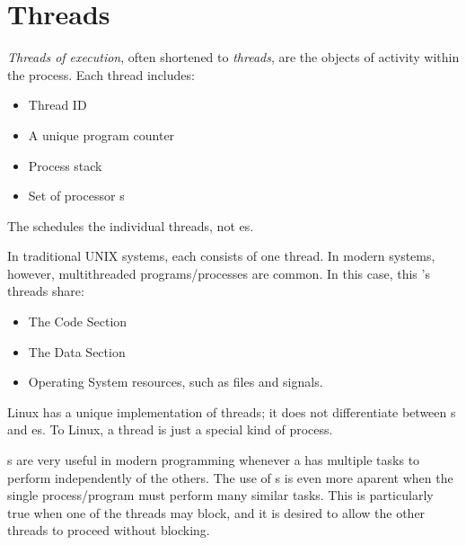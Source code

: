 \section{Threads}\label{sec:Threads}
\begin{definition}[Thread]\label{def:Thread}
  \emph{Threads of execution}, often shortened to \emph{threads}, are the objects of activity within the process.
  Each thread includes:
  \begin{itemize}[noitemsep]
  \item Thread ID
  \item A unique program counter
  \item Process stack
  \item Set of processor s
  \end{itemize}

  The  schedules the individual threads, not es.

  In traditional UNIX systems, each  consists of one thread.
  In modern systems, however, multithreaded programs/processes are common.
  In this case, this 's threads share:
  \begin{itemize}[noitemsep]
  \item The Code Section
  \item The Data Section
  \item Operating System resources, such as files and signals.
  \end{itemize}

  \begin{remark}\label{rmk:Linux_Threads}
    Linux has a unique implementation of threads; it does not differentiate between s and es.
    To Linux, a thread is just a special kind of process.
  \end{remark}
\end{definition}

s are very useful in modern programming whenever a  has multiple tasks to perform independently of the others.
The use of s is even more aparent when the single process/program must perform many similar tasks.
This is particularly true when one of the threads may block, and it is desired to allow the other threads to proceed without blocking.

